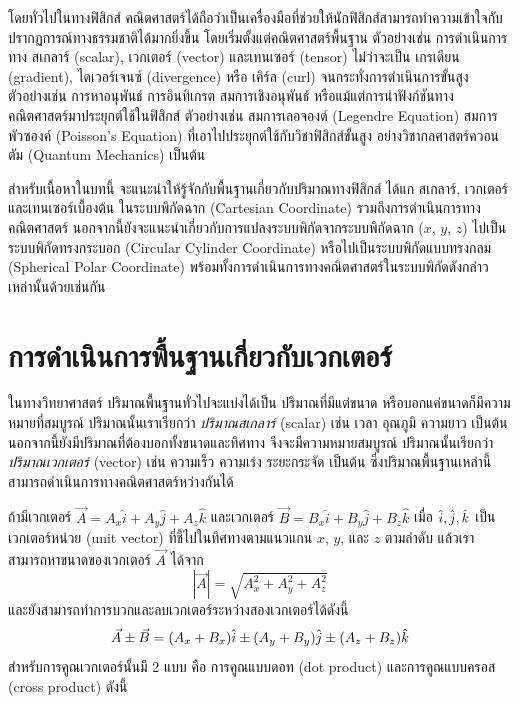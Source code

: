 โดยทั่วไปในทางฟิสิกส์ คณิตศาสตร์ได้ถือว่าเป็นเครื่องมือที่ช่วยให้นักฟิสิกส์สามารถทำความเข้าใจกับปรากฏการณ์ทางธรรมชาติได้มากยิ่งขึ้น โดยเริ่มตั้งแต่คณิตศาสตร์พื้นฐาน ตัวอย่างเช่น การดำเนินการทาง สเกลาร์ (scalar), เวกเตอร์ (vector) และเทนเซอร์ (tensor) ไม่ว่าจะเป็น เกรเดียน (gradient), ไดเวอร์เจนซ์ (divergence) หรือ เคิร์ล (curl) จนกระทั่งการดำเนินการขั้นสูง ตัวอย่างเช่น การหาอนุพันธ์ การอินทิเกรต สมการเชิงอนุพันธ์ หรือแม้แต่การนำฟังก์ชันทางคณิตศาสตร์มาประยุกต์ใช้ในฟิสิกส์ ตัวอย่างเช่น สมการเลอจองด์ (Legendre Equation) สมการพัวซองค์ (Poisson's Equation) ที่เอาไปประยุกต์ใช้กับวิชาฟิสิกส์ขั้นสูง อย่างวิชากลศาสตร์ควอนตัม (Quantum Mechanics) เป็นต้น \cite{Edmund:Dynamics, Planck 2015, wmap9}

สำหรับเนื้อหาในบทนี้ จะแนะนำให้รู้จักกับพื้นฐานเกี่ยวกับปริมาณทางฟิสิกส์ ได้แก สเกลาร์, เวกเตอร์ และเทนเซอร์เบื้องต้น ในระบบพิกัดฉาก (Cartesian Coordinate) รวมถึงการดำเนินการทางคณิตศาสตร์ นอกจากนี้ยังจะแนะนำเกี่ยวกับการแปลงระบบพิกัดจากระบบพิกัดฉาก ($x$, $y$, $z$) ไปเป็นระบบพิกัดทรงกระบอก (Circular Cylinder Coordinate) หรือไปเป็นระบบพิกัดแบบทรงกลม (Spherical Polar Coordinate) พร้อมทั้งการดำเนินการทางคณิตศาสตร์ในระบบพิกัดดังกล่าวเหล่านั้นด้วยเช่นกัน \cite{Power-law, intro:cosmology}

\section{การดำเนินการพื้นฐานเกี่ยวกับเวกเตอร์}

ในทางวิทยาศาสตร์ ปริมาณพื้นฐานทั่วไปจะแบ่งได้เป็น ปริมาณที่มีแต่ขนาด หรือบอกแค่ขนาดก็มีความหมายที่สมบูรณ์ ปริมาณนั้นเราเรียกว่า \textit{ปริมาณสเกลาร์} (scalar) เช่น เวลา อุณภูมิ ความยาว เป็นต้น นอกจากนี้ยังมีปริมาณที่ต้องบอกทั้งขนาดและทิศทาง จึงจะมีความหมายสมบูรณ์ ปริมาณนั้นเรียกว่า \textit{ปริมาณเวกเตอร์} (vector) เช่น ความเร็ว ความเร่ง ระยะกระจัด เป็นต้น ซึ่งปริมาณพื้นฐานเหล่านี้สามารถดำเนินการทางคณิตศาสตร์หว่างกันได้

ถ้ามีเวกเตอร์ $\vec{A} = A_x\hat{i} + A_y\hat{j} + A_z\hat{k}$ และเวกเตอร์ $\vec{B} = B_x\hat{i} + B_y\hat{j} + B_z\hat{k}$ เมื่อ $ \hat{i}, \hat{j}, \hat{k}$ เป็นเวกเตอร์หน่วย (unit vector) ที่ชี้ไปในทิศทางตามแนวแกน $x$, $y$, และ $z$ ตามลำดับ แล้วเราสามารถหาขนาดของเวกเตอร์ $\vec{A}$ ได้จาก
\begin{equation}\label{MagA}
|\vec{A}| = \sqrt{A_x^2 + A_y^2 + A_z^2}
\end{equation}
และยังสามารถทำการบวกและลบเวกเตอร์ระหว่างสองเวกเตอร์ได้ดังนี้
\begin{equation}\label{ApmB}
\vec{A} \pm \vec{B} = (A_x + B_x)\hat{i} \pm (A_y + B_y)\hat{j} \pm (A_z + B_z)\hat{k}
\end{equation}
สำหรับการคูณเวกเตอร์นั้นมี 2 แบบ คือ การคูณแบบดอท (dot product) และการคูณแบบครอส (cross product) ดังนี้

